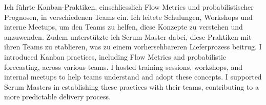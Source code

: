 \begin{cventries}
{\begin{cvitems}
{{				}
			}	
			\item {
				{
					Ich führte Kanban-Praktiken, einschliesslich Flow Metrics und probabilistischer Prognosen, in verschiedenen Teams ein. Ich leitete Schulungen, Workshops und interne Meetups, um den Teams zu helfen, diese Konzepte zu verstehen und anzuwenden. Zudem unterstützte ich Scrum Master dabei, diese Praktiken mit ihren Teams zu etablieren, was zu einem vorhersehbareren Lieferprozess beitrug.
				}
				{
					I introduced Kanban practices, including Flow Metrics and probabilistic forecasting, across various teams. I hosted training sessions, workshops, and internal meetups to help teams understand and adopt these concepts. I supported Scrum Masters in establishing these practices with their teams, contributing to a more predictable delivery process.
				}
			}
		\end{cvitems}
	}	
	
	\cventry
	{ 	}
	{  	}
	{  	}
	{  	}
	{  	}
	

\end{cventries}
